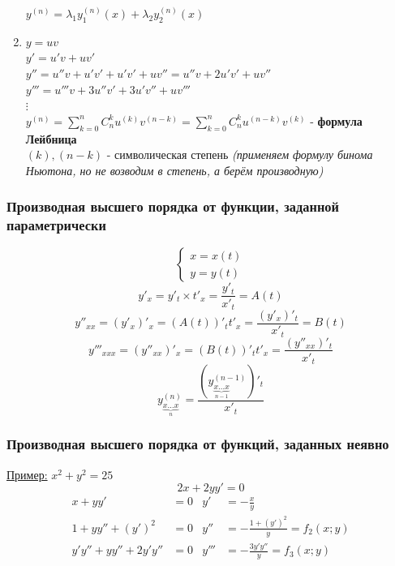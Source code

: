 \documentclass[12pt]{article}
\begin{document}
\begin{enumerate}
        $y^{(n)} = \lambda_1 y_1^{(n)}(x) + \lambda_2 y_2^{(n)}(x)$
        \item $y = uv$\\
        $y' = u'v + uv'$\\
        $y'' = u''v + u'v' + u'v' + uv'' = u''v + 2u'v' + uv''$\\
        $y''' = u'''v + 3u''v' + 3u'v'' + uv'''$\\
        $\vdots$\\
        $y^{(n)} = \sum_{k=0}^{n} C^k_n u^{(k)} v^{(n-k)} = \sum_{k=0}^{n} C^k_n u^{(n-k)} v^{(k)}$ - \textbf{формула Лейбница}\\
        $(k), (n-k)$ - символическая степень \textit{(применяем формулу бинома Ньютона, но не возводим в степень, а берём производную)}
    \end{enumerate}

    \subsubsection*{Производная высшего порядка от функции, заданной параметрически}
    \[ \begin{cases}
        x = x(t)\\
        y = y(t)
    \end{cases} \]
    \[ y'_x = y'_t \times t'_x = \frac{y'_t}{x'_t} = A(t) \]
    \[ y''_{xx} = (y'_x)'_x = (A(t))'_t t'_x = \frac{(y'_x)'_t}{x'_t} = B(t) \]
    \[ y'''_{xxx} = (y''_{xx})'_x = (B(t))'_t t'_x = \frac{(y''_{xx})'_t}{x'_t} \]
    \[ \boxed{y^{(n)}_{\underbrace{x \dots x}_{n}} = \frac{(y^{(n-1)}_{\underbrace{x \dots x}_{n-1}})'_t}{x'_t}} \]
    \subsubsection*{Производная высшего порядка от функций, заданных неявно}
    \underline{Пример:} $x^2 + y^2 = 25$
    \[ 2x + 2yy' = 0 \]
    \begin{align*}
        x + yy' &= 0 & y' &= -\frac{x}{y}\\
        1 + yy'' + (y')^2 &= 0 & y'' &= -\frac{1+(y')^2}{y} = f_2(x;y)\\
        y'y'' + yy'' + 2y'y'' &= 0 & y''' &= -\frac{3y'y''}{y} = f_3(x; y)
    \end{align*}
\end{document}
